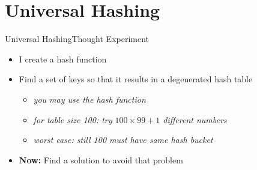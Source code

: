 \section{Universal Hashing}

\def\E{\mathbb{E}}

\begin{frame}{Universal Hashing}{Thought Experiment}
  \begin{itemize}
    \setlength\itemsep{1.5em}
    \item <1->
      I create a hash function
    \item <2->
      Find a set of keys so that it results in a degenerated hash table
      \begin{itemize}
        \item<3->{\it you may use the hash function}\\
        \item<4->{\it for table size 100: try $100\times 99 +1$ different numbers }\\
       \item<5->{\it worst case:  still 100 must have same hash
          bucket }
      \end{itemize}
    \item <5->
      \textbf{Now:} Find a solution to avoid that problem
      
  \end{itemize}
\end{frame}


